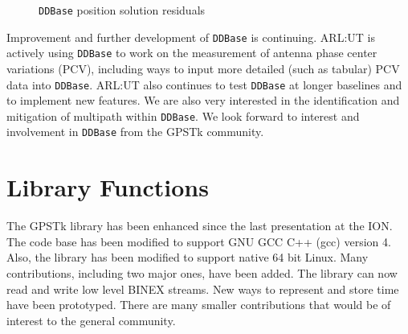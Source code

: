 \documentclass{ion-gps}
\newcommand{\gpstkapplication}[1]{\texttt{#1}}
\begin{document}
\begin{figure}[ht!]

   \caption{\gpstkapplication{DDBase} position solution residuals}

\end{figure}

Improvement and further development of \gpstkapplication{DDBase} is
continuing. ARL:UT is actively using \gpstkapplication{DDBase} to work
on the measurement of antenna phase center variations (PCV), including
ways to input more detailed (such as tabular) PCV data into
\gpstkapplication{DDBase}. ARL:UT also continues to test
\gpstkapplication{DDBase} at longer baselines and to implement new
features. We are also very interested in the identification and
mitigation of multipath within \gpstkapplication{DDBase}. We look
forward to interest and involvement in \gpstkapplication{DDBase} from
the GPSTk community.

\section*{Library Functions}

The GPSTk library has been enhanced since the last presentation at the
ION. The code base has been modified to support GNU GCC C++
(gcc) version 4. Also, the library has been modified to support native
64 bit Linux. Many contributions, including two major ones, have been added. The
library can now read and write low level BINEX streams.  New ways
to represent and store time have been prototyped. There are many
smaller contributions that would be of interest to the general
community.
\end{document}
